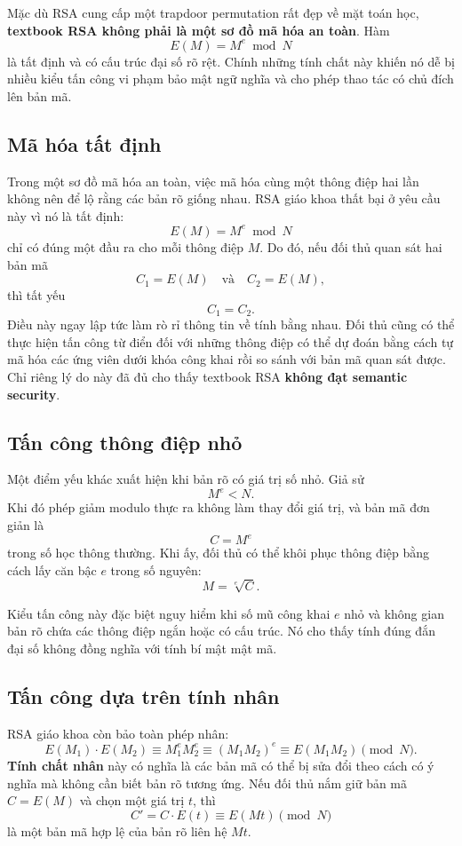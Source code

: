 Mặc dù RSA cung cấp một trapdoor permutation rất đẹp về mặt toán học, \textbf{textbook RSA không phải là một sơ đồ mã hóa an toàn}. Hàm
\[
E(M) = M^e \bmod N
\]
là tất định và có cấu trúc đại số rõ rệt. Chính những tính chất này khiến nó dễ bị nhiều kiểu tấn công vi phạm bảo mật ngữ nghĩa và cho phép thao tác có chủ đích lên bản mã.

\subsection{Mã hóa tất định}

Trong một sơ đồ mã hóa an toàn, việc mã hóa cùng một thông điệp hai lần không nên để lộ rằng các bản rõ giống nhau. RSA giáo khoa thất bại ở yêu cầu này vì nó là tất định:
\[
E(M) = M^e \bmod N
\]
chỉ có đúng một đầu ra cho mỗi thông điệp $M$. Do đó, nếu đối thủ quan sát hai bản mã
\[
C_1 = E(M) \quad \text{và} \quad C_2 = E(M),
\]
thì tất yếu
\[
C_1 = C_2.
\]
Điều này ngay lập tức làm rò rỉ thông tin về tính bằng nhau. Đối thủ cũng có thể thực hiện tấn công từ điển đối với những thông điệp có thể dự đoán bằng cách tự mã hóa các ứng viên dưới khóa công khai rồi so sánh với bản mã quan sát được. Chỉ riêng lý do này đã đủ cho thấy textbook RSA \textbf{không đạt semantic security}.

\subsection{Tấn công thông điệp nhỏ}

Một điểm yếu khác xuất hiện khi bản rõ có giá trị số nhỏ. Giả sử
\[
M^e < N.
\]
Khi đó phép giảm modulo thực ra không làm thay đổi giá trị, và bản mã đơn giản là
\[
C = M^e
\]
trong số học thông thường. Khi ấy, đối thủ có thể khôi phục thông điệp bằng cách lấy căn bậc $e$ trong số nguyên:
\[
M = \sqrt[e]{C}.
\]

Kiểu tấn công này đặc biệt nguy hiểm khi số mũ công khai $e$ nhỏ và không gian bản rõ chứa các thông điệp ngắn hoặc có cấu trúc. Nó cho thấy tính đúng đắn đại số không đồng nghĩa với tính bí mật mật mã.

\subsection{Tấn công dựa trên tính nhân}

RSA giáo khoa còn bảo toàn phép nhân:
\[
E(M_1)\cdot E(M_2) \equiv M_1^e M_2^e \equiv (M_1M_2)^e \equiv E(M_1M_2) \pmod{N}.
\]
\textbf{Tính chất nhân} này có nghĩa là các bản mã có thể bị sửa đổi theo cách có ý nghĩa mà không cần biết bản rõ tương ứng. Nếu đối thủ nắm giữ bản mã $C = E(M)$ và chọn một giá trị $t$, thì
\[
C' = C \cdot E(t) \equiv E(Mt) \pmod{N}
\]
là một bản mã hợp lệ của bản rõ liên hệ $Mt$.


